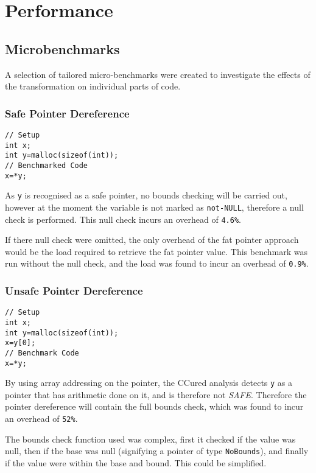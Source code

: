 \section{Performance}
\subsection{Microbenchmarks}

A selection of tailored micro-benchmarks were created to investigate the effects of the transformation on individual parts of code.

\subsubsection{Safe Pointer Dereference}

\begin{verbatim}
// Setup
int x;
int y=malloc(sizeof(int));
// Benchmarked Code
x=*y;
\end{verbatim}

As \verb!y! is recognised as a safe pointer, no bounds checking will be carried out, however at the moment the variable is not marked as \verb!not-NULL!, therefore a null check is performed.
This null check incurs an overhead of \verb!4.6%!.

If there null check were omitted, the only overhead of the fat pointer approach would be the load required to retrieve the fat pointer value.
This benchmark was run without the null check, and the load was found to incur an overhead of \verb!0.9%!.

\subsubsection{Unsafe Pointer Dereference}

\begin{verbatim}
// Setup
int x;
int y=malloc(sizeof(int));
x=y[0];
// Benchmark Code
x=*y;
\end{verbatim}

By using array addressing on the pointer, the CCured analysis detects \verb!y! as a pointer that has arithmetic done on it, and is therefore not \textit{SAFE}.
Therefore the pointer dereference will contain the full bounds check, which was found to incur an overhead of \verb!52%!.

The bounds check function used was complex, first it checked if the value was null, then if the base was null (signifying a pointer of type \verb!NoBounds!), and finally if the value were within the base and bound.
This could be simplified.

